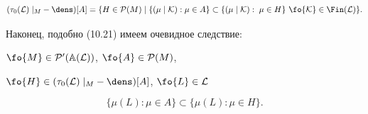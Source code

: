 $$


({{{\tau}_0}({\cal L})\mid_M} - \dens)[A] = \{H \in {{\cal P}(M)} \mid


\{(\mu\mid{\cal K}):\mu \in


A\} \subset\{(\mu\mid{\cal K}):\;\mu \in H\}


\ \fo{\cal K} \in {\Fin}({\cal L})\}.


$$





Наконец, подобно (10.21) имеем очевидное следствие:


$\fo{M} \in {{\cal P}'({\Bbb A}({\cal L}))}$, $\fo{A} \in {{\cal P}(M)}$,


$\fo{H} \in ({{{\tau}_0}({\cal L})\mid_M} - \dens)[A]$, $\fo{L} \in


{\cal L}$


$$


\{{\mu}(L):\mu \in A\} \subset \{{\mu}(L):\mu \in H\}.


$$








